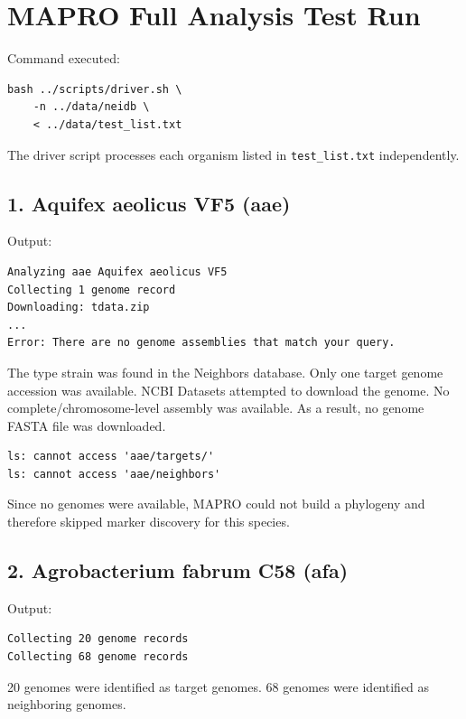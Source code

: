 \documentclass[11pt]{article}
\author{Elif Güler}
\date{\today}
\title{}
\begin{document}
\tableofcontents

\section{MAPRO Full Analysis Test Run}
\label{sec:orga653e3c}

Command executed:

\begin{verbatim}
bash ../scripts/driver.sh \
    -n ../data/neidb \
    < ../data/test_list.txt
\end{verbatim}

The driver script processes each organism listed in \texttt{test\_list.txt} independently.
\subsection{1. Aquifex aeolicus VF5 (aae)}
\label{sec:orgc51af88}

Output:

\begin{verbatim}
Analyzing aae Aquifex aeolicus VF5
Collecting 1 genome record
Downloading: tdata.zip
...
Error: There are no genome assemblies that match your query.
\end{verbatim}

The type strain was found in the Neighbors database. Only one target genome accession was available. NCBI Datasets attempted to download the genome. No complete/chromosome-level assembly was available. As a result, no genome FASTA file was downloaded.

\begin{verbatim}
ls: cannot access 'aae/targets/'
ls: cannot access 'aae/neighbors'
\end{verbatim}

Since no genomes were available, MAPRO could not build a phylogeny and therefore skipped marker discovery for this species.
\subsection{2. Agrobacterium fabrum C58 (afa)}
\label{sec:org33403f5}

Output:

\begin{verbatim}
Collecting 20 genome records
Collecting 68 genome records
\end{verbatim}

20 genomes were identified as target genomes. 68 genomes were identified as neighboring genomes.
\end{document}
